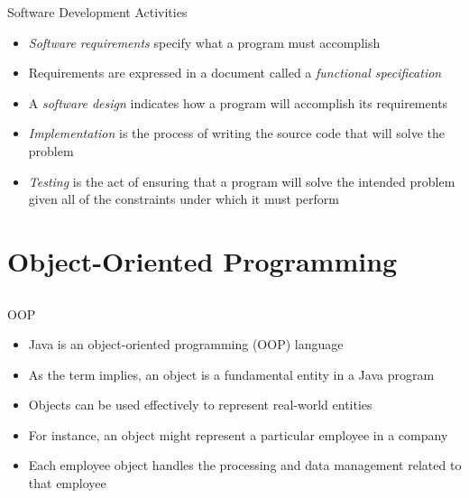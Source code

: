 \documentclass{beamer}
\begin{document}
\begin{frame}{Software Development Activities}
\begin{itemize}
\item \textit{Software requirements} specify what a program must accomplish
\item Requirements are expressed in a document called a \textit{functional specification}
\item A \textit{software design} indicates how a program will accomplish its requirements
\item \textit{Implementation} is the process of writing the source code that will solve the problem
\item \textit{Testing} is the act of ensuring that a program will solve the intended problem given all of the constraints under which it must perform
\end{itemize}
\end{frame}

\section{Object-Oriented Programming}
\subsection{}
\begin{frame}{OOP}
\begin{itemize}
\item Java is an object-oriented programming (OOP) language
\item As the term implies, an object is a fundamental entity in a Java program
\item Objects can be used effectively to represent real-world entities
\item For instance, an object might represent a particular employee in a company
\item Each employee object handles the processing and data management related to that employee
\end{itemize}
\end{frame}
\end{document}
